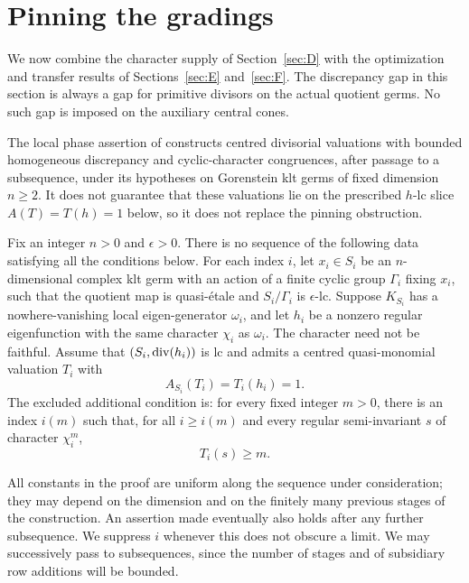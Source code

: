 \section{Pinning the gradings}\label{sec:G}

We now combine the character supply of Section~\ref{sec:D} with the
optimization and transfer results of Sections~\ref{sec:E} and~\ref{sec:F}.
The discrepancy gap in this section is always a gap for primitive divisors
on the actual quotient germs.  No such gap is imposed on the auxiliary
central cones.

The local phase assertion of \cite[Theorem~3.1]{OpenAILocalPhase2026}
constructs centred divisorial valuations with bounded homogeneous discrepancy
and cyclic-character congruences, after passage to a subsequence, under its
hypotheses on Gorenstein klt germs of fixed dimension $n\ge2$.
It does not guarantee that these valuations lie on the prescribed $h$-lc
slice $A(T)=T(h)=1$ below, so it does not replace the pinning obstruction.

\begin{theorem}\label{thm:G-pinning}
Fix an integer $n>0$ and $\epsilon>0$.  There is no sequence of the following
data satisfying all the conditions below.  For each index $i$, let
$x_i\in S_i$ be an $n$-dimensional complex klt germ with an action of a
finite cyclic group $\Gamma_i$ fixing $x_i$, such that the quotient map is
quasi-\'etale and $S_i/\Gamma_i$ is $\epsilon$-lc.  Suppose $K_{S_i}$ has a
nowhere-vanishing local eigen-generator $\omega_i$, and let $h_i$ be a
nonzero regular eigenfunction with the same character $\chi_i$ as
$\omega_i$.  The character need not be faithful.  Assume that
$(S_i,\operatorname{div}(h_i))$ is lc and admits a centred quasi-monomial valuation
$T_i$ with
\[
 A_{S_i}(T_i)=T_i(h_i)=1.
\]
The excluded additional condition is: for every fixed integer $m>0$,
there is an index $i(m)$ such that, for all $i\ge i(m)$ and every regular
semi-invariant $s$ of character $\chi_i^m$,
\begin{equation}\label{eq:G-input}
                         T_i(s)\ge m.
\end{equation}
\end{theorem}

All constants in the proof are uniform along the sequence under
consideration; they may depend on the dimension and on the finitely many
previous stages of the construction.  An assertion made eventually also
holds after any further subsequence.  We suppress $i$ whenever this does
not obscure a limit.  We may successively pass to subsequences, since the
number of stages and of subsidiary row additions will be bounded.

